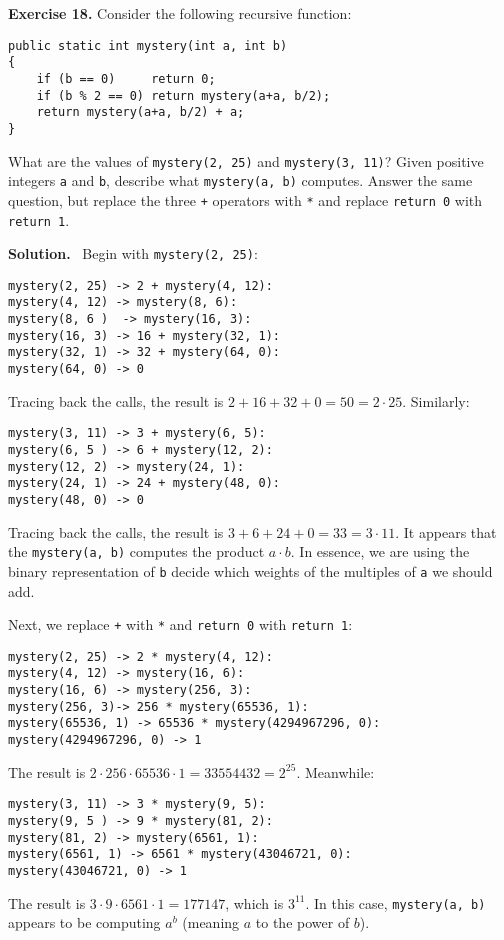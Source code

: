 \documentclass[12pt, a4paper]{article}
\newenvironment{ex}[2][Exercise]
{\par\medskip\noindent \textbf{#1 #2.}}
{\medskip}
\newenvironment{sol}[1][Solution]
{\par\medskip\noindent \textbf{#1.} }
{\medskip}
\begin{document}
	\begin{ex}{18}
		Consider the following recursive function:
		\begin{lstlisting}
public static int mystery(int a, int b)
{
	if (b == 0)		return 0;
	if (b % 2 == 0)	return mystery(a+a, b/2);
	return mystery(a+a, b/2) + a;
}
		\end{lstlisting}
	What are the values of \texttt{mystery(2, 25)} and \texttt{mystery(3, 11)}? Given positive integers
	\texttt{a} and \texttt{b}, describe what \texttt{mystery(a, b)} computes. Answer the same
	question, but replace the three \texttt{+} operators with \texttt{*} and replace
	\texttt{return 0} with \texttt{return 1}.
	\end{ex}
	\begin{sol}
		\
		Begin with \texttt{mystery(2, 25)}:
		\begin{lstlisting}
mystery(2, 25) -> 2 + mystery(4, 12):
mystery(4, 12) -> mystery(8, 6):
mystery(8, 6 )  -> mystery(16, 3):
mystery(16, 3) -> 16 + mystery(32, 1):
mystery(32, 1) -> 32 + mystery(64, 0):
mystery(64, 0) -> 0
		\end{lstlisting}
		Tracing back the calls, the result is $2 + 16 + 32 + 0 = 50 = 2\cdot 25$.
		Similarly:
		\begin{lstlisting}
mystery(3, 11) -> 3 + mystery(6, 5):
mystery(6, 5 ) -> 6 + mystery(12, 2):
mystery(12, 2) -> mystery(24, 1):
mystery(24, 1) -> 24 + mystery(48, 0):
mystery(48, 0) -> 0
		\end{lstlisting}
		Tracing back the calls, the result is $3 + 6 + 24 + 0 = 33 = 3\cdot 11$.
		It appears that the \texttt{mystery(a, b)} computes the product $a\cdot b$.
		In essence, we are using the binary representation of \texttt{b} decide which
		weights of the multiples of \texttt{a} we should add.

		Next, we replace \texttt{+} with \texttt{*} and \texttt{return 0} with \texttt{return 1}:
		\begin{lstlisting}
mystery(2, 25) -> 2 * mystery(4, 12):
mystery(4, 12) -> mystery(16, 6):
mystery(16, 6) -> mystery(256, 3):
mystery(256, 3)-> 256 * mystery(65536, 1):
mystery(65536, 1) -> 65536 * mystery(4294967296, 0):
mystery(4294967296, 0) -> 1
		\end{lstlisting}
		The result is $2 \cdot 256 \cdot 65536 \cdot 1 = 33554432 = 2^{25}$.
		Meanwhile:
		\begin{lstlisting}
mystery(3, 11) -> 3 * mystery(9, 5):
mystery(9, 5 ) -> 9 * mystery(81, 2):
mystery(81, 2) -> mystery(6561, 1):
mystery(6561, 1) -> 6561 * mystery(43046721, 0):
mystery(43046721, 0) -> 1
		\end{lstlisting}
		The result is $3\cdot 9\cdot 6561\cdot 1 = 177147$, which is $3^{11}$.
		In this case, \texttt{mystery(a, b)} appears to be computing $a^b$ (meaning
		$a$ to the power of $b$).
	\end{sol}
\end{document}
